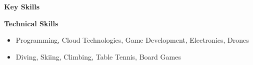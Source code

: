 \documentclass[a4paper, 11pt, final, oneside, notitlepage]{article}
\begin{document}
  \fancyfoot{}


  \textbf{Key Skills}\vspace{-\baselineskip}
  \begin{multicols}{3}
    \keyskills
  \end{multicols}

  \vspace{-\baselineskip}

  \textbf{Technical Skills}\vspace{-\parskip}
  \technicalskills





  \vspace{-\baselineskip}
  \begin{itemize}[noitemsep, nosep]
    \item Programming, Cloud Technologies, Game Development, Electronics, Drones
    \item Diving, Skiing, Climbing, Table Tennis, Board Games
  \end{itemize}
\end{document}
